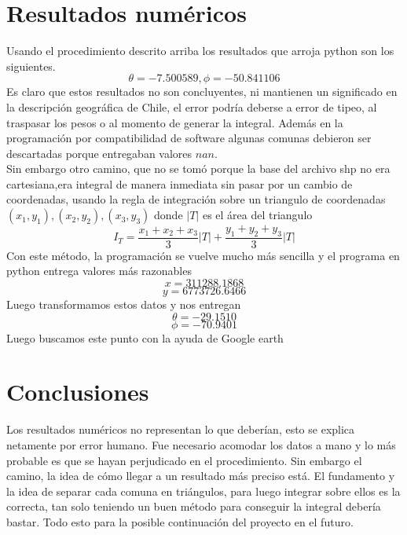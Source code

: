 \documentclass[20pt]{report}
\begin{document}
\begin{itemize}
\label{cap.introduccion}\section{Resultados num\'ericos}
Usando el procedimiento descrito arriba los resultados  que arroja python son los siguientes.
\[\theta=-7.500589,\phi=-50.841106\]
Es claro que estos resultados no son concluyentes, ni mantienen un significado en la descripci\'on geogr\'afica de Chile, el error podr\'ia deberse a error de tipeo, al traspasar los pesos o  al momento de  generar la integral. Adem\'as en la programaci\'on por compatibilidad de software algunas comunas debieron ser descartadas porque entregaban valores $nan$. \\

Sin embargo otro camino, que no se tom\'o porque la base del archivo shp no era cartesiana,era integral de manera inmediata sin pasar por un cambio de coordenadas, usando la regla de integraci\'on sobre un triangulo de coordenadas $(x_1,y_1),(x_2,y_2),(x_3,y_3)$ donde $|T|$ es el \'area del triangulo
\[I_T=\frac{x_1+x_2+x_3}{3}|T|+\frac{y_1+y_2+y_3}{3}|T|\]
Con este m\'etodo, la programaci\'on se vuelve mucho m\'as sencilla y el programa en python entrega valores m\'as razonables
\[x=311288.1868\]
\[y=6773726.6466\]
Luego transformamos estos datos y nos entregan
\[\theta=-29.1510\]
\[\phi=-70.9401\]
Luego buscamos este punto con la ayuda de Google earth
\begin{figure}[H]
    \centering
\end{figure}
\section{Conclusiones}
Los resultados num\'ericos no representan lo que deber\'ian, esto se explica netamente por error humano. Fue necesario acomodar los datos a mano y lo m\'as probable es que se hayan perjudicado en el procedimiento. Sin embargo el camino, la idea de c\'omo llegar a un resultado  m\'as preciso est\'a. El fundamento y la idea de separar cada comuna en  tri\'angulos, para luego integrar sobre ellos es la correcta, tan solo teniendo un buen m\'etodo para conseguir la integral  deber\'ia bastar. Todo esto para la posible continuaci\'on del proyecto en el futuro.\\


\end{itemize}
\end{document}
